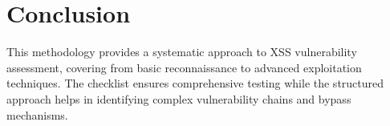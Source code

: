 \documentclass[12pt]{article}
\begin{document}
\section*{Conclusion}
This methodology provides a systematic approach to XSS vulnerability assessment, covering from basic reconnaissance to advanced exploitation techniques. The checklist ensures comprehensive testing while the structured approach helps in identifying complex vulnerability chains and bypass mechanisms.
\end{document}
